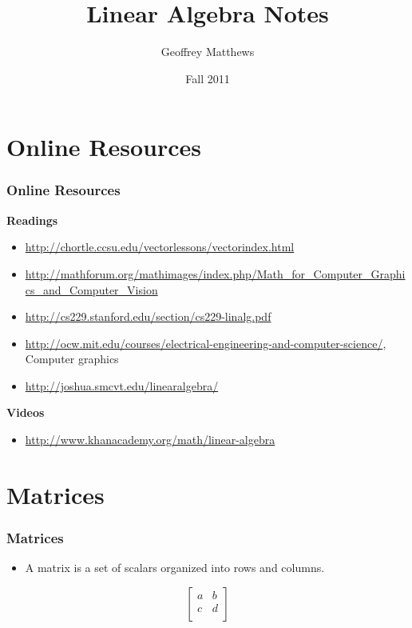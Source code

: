 \documentclass[]{beamer}
\title[Linear Algebra Notes]
{
Linear Algebra Notes
}
\author[Geoffrey Matthews]
{Geoffrey Matthews}
\institute[WWU/CS]
{
  Department of Computer Science\\
  Western Washington University
}
\date{Fall 2011}
\newcommand{\myref}[1]{\small\item\url{#1}}
\newcommand{\myreff}[1]{\scriptsize\item\url{#1}}
\newcommand{\sect}[1]{
\section{#1}
\begin{frame}[fragile]\frametitle{#1}
}
\begin{document}
\begin{frame}
  \titlepage
\end{frame}



\sect{Online Resources}

{\bf Readings}
\begin{itemize}
  \myref{http://chortle.ccsu.edu/vectorlessons/vectorindex.html}
  \myref{http://mathforum.org/mathimages/index.php/Math_for_Computer_Graphics_and_Computer_Vision}
\myref{http://cs229.stanford.edu/section/cs229-linalg.pdf}

\myreff{http://ocw.mit.edu/courses/electrical-engineering-and-computer-science/}, Computer graphics
\myref{http://joshua.smcvt.edu/linearalgebra/}
\end{itemize}
{\bf Videos}
\begin{itemize}
\myref{http://www.khanacademy.org/math/linear-algebra}
\end{itemize}
\end{frame}


\sect{Matrices}
\begin{itemize}
\item A matrix is a set of scalars organized into rows and columns.
\end{itemize}
\[
\left[\begin{array}{cc}
a & b \\
c & d \\
\end{array}
\right]
\]

\end{frame}
\end{document}
